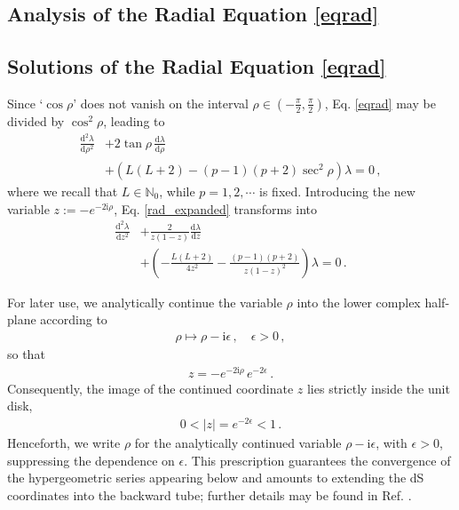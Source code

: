 \documentclass[aps,twocolumn,nofootinbib]{revtex4}
\begin{document}
{\begin{appendix}
\section{Analysis of the Radial Equation \eqref{eqrad}} \label{App. IndeSolu}


\subsection{Solutions of the Radial Equation \eqref{eqrad}}\label{details-on-se.3}

Since `$\cos\rho$' does not vanish on the interval
$\rho\in\left(-\frac{\pi}{2},\frac{\pi}{2}\right)$,
Eq. \eqref{eqrad} may be divided by $\cos^2\rho$, leading to
\begin{align} \label{rad_expanded}
    \frac{\mathrm{d}^2_{}\lambda}{\mathrm{d}\rho^2_{}} &+2\tan\rho\, \frac{\mathrm{d}\lambda}{\mathrm{d}\rho} \nonumber\\[3pt]
    &+ \left(L(L+2) - (p-1)(p+2)\sec^2_{}\rho\right)\lambda = 0\,,
\end{align}
where we recall that $L\in\mathbb{N}_0$, while $p=1,2,\cdots$ is fixed. Introducing the new variable $z:=-e_{}^{-2\mathrm{i}\rho}$, Eq. \eqref{rad_expanded} transforms into
\begin{align}
    \frac{\mathrm{d}_{}^2\lambda}{\mathrm{d}z_{}^2}&+\frac{2}{z(1-z)}\frac{\mathrm{d}\lambda}{\mathrm{d}z}\nonumber\\[3pt]
    &+\left(-\frac{L(L+2)}{4z_{}^2} - \frac{(p-1)(p+2)}{z(1-z)_{}^2}\right)\lambda=0\,.\label{eq:A27}
\end{align}

For later use, we analytically continue the variable $\rho$ into the lower complex half-plane according to
\begin{align}
    \rho \longmapsto \rho-\mathrm{i}\epsilon \,, \quad \epsilon>0 \,,
\end{align}
so that
\begin{align}
    z=-e^{-2\mathrm{i}\rho} \,e^{-2\epsilon} \,.
\end{align}
Consequently, the image of the continued coordinate $z$ lies strictly inside the unit disk,
\begin{align}
    0<|z|=e^{-2\epsilon}<1 \,.
\end{align}
Henceforth, we write $\rho$ for the analytically continued variable $\rho-\mathrm{i}\epsilon$, with $\epsilon>0$, suppressing the dependence on $\epsilon$. This prescription guarantees the convergence of the hypergeometric series appearing below and amounts to extending the dS coordinates into the backward tube; further details may be found in Ref. \cite{Gazeau2022}.


\end{appendix}}
\end{document}
